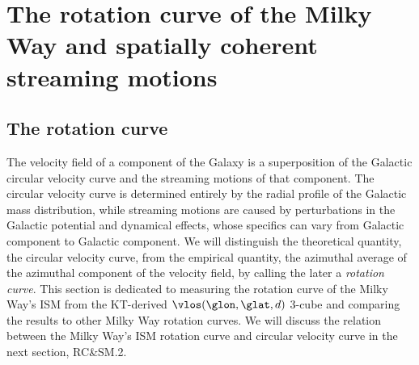 \section{The rotation curve of the Milky Way and spatially coherent streaming motions}
\label{sec:rotation_curve}

\subsection{The rotation curve}
\label{sec:rotation_fit}

The velocity field of a component of the Galaxy is a superposition of the Galactic circular velocity curve and the streaming motions of that component. 
The circular velocity curve is determined entirely by the radial profile of the Galactic mass distribution, while streaming motions are caused by perturbations in the Galactic potential and dynamical effects, whose specifics can vary from Galactic component to Galactic component. 
We will distinguish the theoretical quantity, the circular velocity curve, from the empirical quantity, the azimuthal average of the azimuthal component of the velocity field, by calling the later a \emph{rotation curve}. 
This section is dedicated to measuring the rotation curve of the Milky Way's ISM from the KT-derived $\vlos(\glon, \glat, d)$ 3-cube and comparing the results to other Milky Way rotation curves. 
We will discuss the relation between the Milky Way's ISM rotation curve and circular velocity curve in the next section, RC&SM.2. 

